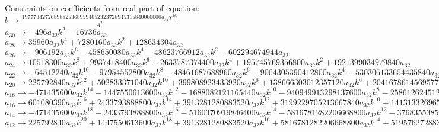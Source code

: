 \documentclass[12pt,a4paper,draft]{article}
\begin{document}
Constraints on coefficients from real part of equation:
\\$b\to \frac{197773427268988253689594652323728945315840000000 a_{32} \chi ^{16}}{A^2}$\\
$a_{30}\to -496 a_{32} k^2-16736 a_{32}$\\
$a_{28}\to 35960 a_{32} k^4+7280160 a_{32} k^2+128634304 a_{32}$\\
$a_{26}\to -906192 a_{32} k^6-458650080 a_{32} k^4-48623766912 a_{32} k^2-602294674944 a_{32}$\\
$a_{24}\to 10518300 a_{32} k^8+9937418400 a_{32} k^6+2633787374400 a_{32} k^4+195745769356800 a_{32} k^2+1921399034979840 a_{32}$\\
$a_{22}\to -64512240 a_{32} k^{10}-97954552800 a_{32} k^8-48461687688960 a_{32} k^6-9004305390412800 a_{32} k^4-530306133654435840 a_{32} k^2-4424871564282224640 a_{32}$\\
$a_{20}\to 225792840 a_{32} k^{12}+502833371040 a_{32} k^{10}+399808923433920 a_{32} k^8+138666303012357120 a_{32} k^6+20416786145695779840 a_{32} k^4+1022145331349193891840 a_{32} k^2+7603550585159681556480 a_{32}$\\
$a_{18}\to -471435600 a_{32} k^{14}-1447550613600 a_{32} k^{12}-1688082121165440 a_{32} k^{10}-940949913298137600 a_{32} k^8-258612624512146544640 a_{32} k^6-32367935492724473241600 a_{32} k^4-1444674611180339495731200 a_{32} k^2-9936653556286701091553280 a_{32}$\\
$a_{16}\to 601080390 a_{32} k^{16}+2433793888800 a_{32} k^{14}+3913281280883520 a_{32} k^{12}+3199229705213667840 a_{32} k^{10}+1413133269655657904640 a_{32} k^8+330152942025789627064320 a_{32} k^6+36839202585098657141145600 a_{32} k^4+1520307994111865267007651840 a_{32} k^2+9972324216558579096070717440 a_{32}$\\
$a_{14}\to -471435600 a_{32} k^{18}-2433793888800 a_{32} k^{16}-5160370919846400 a_{32} k^{14}-5816781282206668800 a_{32} k^{12}-3768355385748421079040 a_{32} k^{10}-1414941180110526973132800 a_{32} k^8-294713620680789257129164800 a_{32} k^6-30406159882237305340153036800 a_{32} k^4-1196678905987029491528486092800 a_{32} k^2-7704677783600157503668973731840 a_{32}$\\
$a_{12}\to 225792840 a_{32} k^{20}+1447550613600 a_{32} k^{18}+3913281280883520 a_{32} k^{16}+5816781282206668800 a_{32} k^{14}+5195762728834944215040 a_{32} k^{12}+2861325497556843434557440 a_{32} k^{10}+957819267212565085669785600 a_{32} k^8+184464036618906319063595089920 a_{32} k^6+18149630074136613954848705740800 a_{32} k^4+701125678307614332833876609597440 a_{32} k^2+4563377558393193884147341479378944 a_{32}$\\
\end{document}
